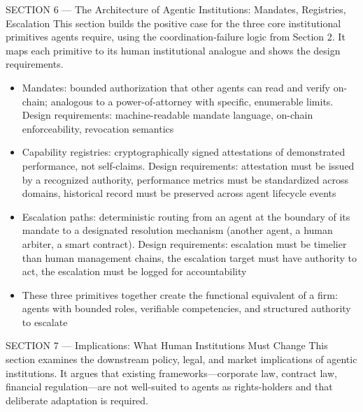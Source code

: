 \documentclass[
]{article}
\providecommand{\tightlist}{%
  \setlength{\itemsep}{0pt}\setlength{\parskip}{0pt}}
\begin{document}
SECTION 6 --- The Architecture of Agentic Institutions: Mandates,
Registries, Escalation This section builds the positive case for the
three core institutional primitives agents require, using the
coordination-failure logic from Section 2. It maps each primitive to its
human institutional analogue and shows the design requirements.

\begin{itemize}
\tightlist
\item
  Mandates: bounded authorization that other agents can read and verify
  on-chain; analogous to a power-of-attorney with specific, enumerable
  limits. Design requirements: machine-readable mandate language,
  on-chain enforceability, revocation semantics
\item
  Capability registries: cryptographically signed attestations of
  demonstrated performance, not self-claims. Design requirements:
  attestation must be issued by a recognized authority, performance
  metrics must be standardized across domains, historical record must be
  preserved across agent lifecycle events
\item
  Escalation paths: deterministic routing from an agent at the boundary
  of its mandate to a designated resolution mechanism (another agent, a
  human arbiter, a smart contract). Design requirements: escalation must
  be timelier than human management chains, the escalation target must
  have authority to act, the escalation must be logged for
  accountability
\item
  These three primitives together create the functional equivalent of a
  firm: agents with bounded roles, verifiable competencies, and
  structured authority to escalate
\end{itemize}

SECTION 7 --- Implications: What Human Institutions Must Change This
section examines the downstream policy, legal, and market implications
of agentic institutions. It argues that existing frameworks---corporate
law, contract law, financial regulation---are not well-suited to agents
as rights-holders and that deliberate adaptation is required.
\end{document}
